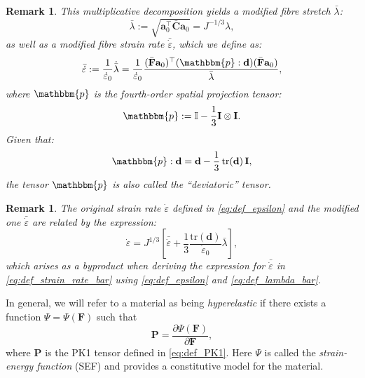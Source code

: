 \documentclass{sfuthesis}
\numberwithin{equation}{section}
\numberwithin{figure}{chapter}
\numberwithin{table}{chapter}
\newtheorem{remark}[theorem]{Remark}
\theoremstyle{definition}
\def\*#1{{\mathbf{#1}}} %
\newcommand{\pder}[2]{\dfrac{\partial #1}{\partial #2}}
\newcommand{\depsilon}{\dot{\varepsilon}}
\newcommand{\T}{\top}
\newcommand{\p}{\mathbbm{p}}
\begin{document}
\begin{remark}
    This multiplicative decomposition yields a \textit{modified fibre stretch} $\bar{\lambda}$:
    \begin{equation} \label{eq:def_lambda_bar}
    \bar{\lambda} := \sqrt{\*a_0^\T \bar{\*C} \*a_0} = J^{-1/3} \lambda,
    \end{equation}
    as well as a \textit{modified fibre strain rate} $\bar{\depsilon}$, which we define as:
    \begin{equation} \label{eq:def_strain_rate_bar}
    \bar{\depsilon} := \dfrac{1}{\depsilon_0} \dot{\bar{\lambda}} = \dfrac{1}{\depsilon_0} \dfrac{(\bar{\*F}\*a_0)^\T (\p : \*d) (\bar{\*F} \*a_0)}{\bar{\lambda}},
    \end{equation}
    where $\p$ is the fourth-order \textit{spatial projection tensor}:
    \begin{equation} \label{eq:def_projection_spatial}
    \p := \mathbb{I} - \dfrac{1}{3} \*I \otimes \*I.
    \end{equation}
    Given that:
    \begin{equation}
        \p : \*d = \*d - \dfrac{1}{3} \, \mathrm{tr}(\*d) \, \*I,
    \end{equation}
    the tensor $\p$ is also called the ``deviatoric'' tensor.
\end{remark}

\begin{remark}
    The original strain rate $\depsilon$ defined in \eqref{eq:def_epsilon} and the modified one $\bar{\depsilon}$ are related by the expression:
    \begin{equation} \label{eq:def_strain_rate_fibre_non_bar}
        \depsilon = J^{1/3} \left[ \bar{\depsilon} + \dfrac{1}{3} \dfrac{\mathrm{tr}(\*d)}{\depsilon_0} \bar{\lambda} \right],
    \end{equation}
    which arises as a byproduct when deriving the expression for $\bar{\depsilon}$ in \eqref{eq:def_strain_rate_bar} using \eqref{eq:def_epsilon} and \eqref{eq:def_lambda_bar}.
\end{remark}


In general, we will refer to a material as being \textit{hyperelastic} if there exists a function $\Psi = \Psi(\*F)$ such that
\begin{equation}
    \*P = \pder{\Psi(\*F)}{\*F},
\end{equation}
where $\*P$ is the PK1 tensor defined in \eqref{eq:def_PK1}. Here $\Psi$ is called the \textit{strain-energy function} (SEF) and provides a constitutive model for the material.
\end{document}
